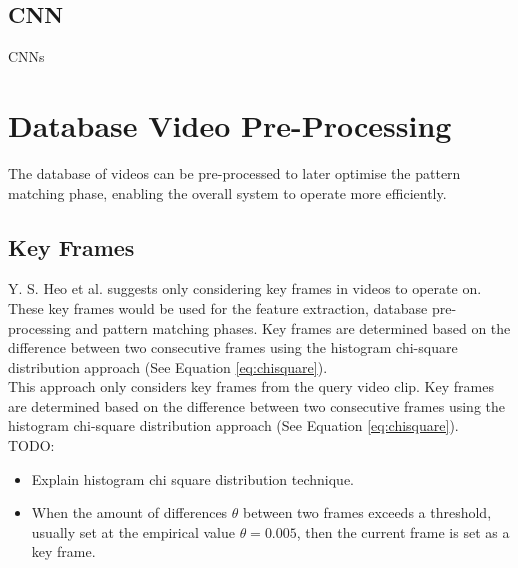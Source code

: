 
\subsection{CNN}

CNNs


\section{Database Video Pre-Processing}

The database of videos can be pre-processed to later optimise the pattern matching phase, enabling the overall system to operate more efficiently.


\subsection{Key Frames}

Y. S. Heo et al. \cite{heo2016colortransfer} suggests only considering key frames in videos to operate on. These key frames would be used for the feature extraction, database pre-processing and pattern matching phases. Key frames are determined based on the difference between two consecutive frames using the histogram chi-square distribution approach (See Equation \ref{eq:chisquare}).\\

\cite{heo2016colortransfer}
This approach only considers key frames from the query video clip. Key frames are determined based on the difference between two consecutive frames using the histogram chi-square distribution approach (See Equation \ref{eq:chisquare}).\\

TODO:
\begin{itemize}
    \item Explain histogram chi square distribution technique.
    \item When the amount of differences $\theta$ between two frames exceeds a threshold, usually set at the empirical value $\theta = 0.005$, then the current frame is set as a key frame.
\end{itemize}

